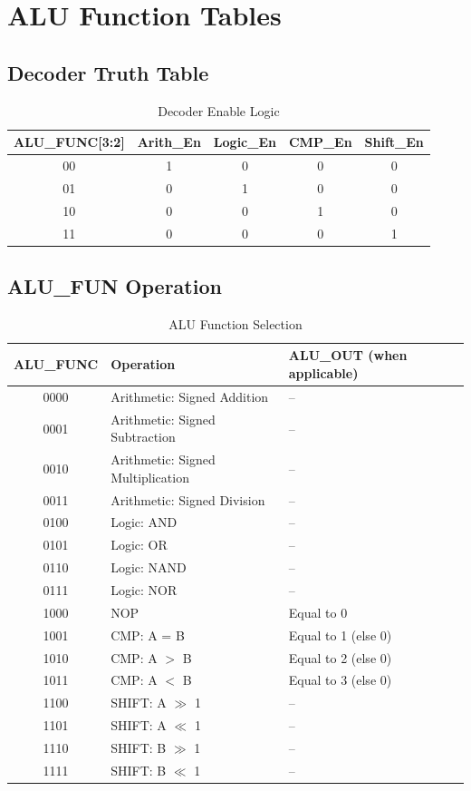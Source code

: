 \documentclass[11pt]{article}
\begin{document}
\section{ALU Function Tables}

\subsection{Decoder Truth Table}
\begin{table}[H]
    \centering
    \begin{tabular}{ccccc}
        \toprule
        \textbf{ALU\_FUNC[3:2]} & \textbf{Arith\_En} & \textbf{Logic\_En} & \textbf{CMP\_En} & \textbf{Shift\_En} \\
        \midrule
        00 & 1 & 0 & 0 & 0 \\
        01 & 0 & 1 & 0 & 0 \\
        10 & 0 & 0 & 1 & 0 \\
        11 & 0 & 0 & 0 & 1 \\
        \bottomrule
    \end{tabular}
    \caption{Decoder Enable Logic}
\end{table}

\subsection{ALU\_FUN Operation}
\begin{table}[H]
    \centering
    \begin{tabular}{cll}
        \toprule
        \textbf{ALU\_FUNC} & \textbf{Operation} & \textbf{ALU\_OUT (when applicable)} \\
        \midrule
        0000 & Arithmetic: Signed Addition & -- \\
        0001 & Arithmetic: Signed Subtraction & -- \\
        0010 & Arithmetic: Signed Multiplication & -- \\
        0011 & Arithmetic: Signed Division & -- \\
        0100 & Logic: AND & -- \\
        0101 & Logic: OR & -- \\
        0110 & Logic: NAND & -- \\
        0111 & Logic: NOR & -- \\
        1000 & NOP & Equal to 0 \\
        1001 & CMP: A = B & Equal to 1 (else 0) \\
        1010 & CMP: A $>$ B & Equal to 2 (else 0) \\
        1011 & CMP: A $<$ B & Equal to 3 (else 0) \\
        1100 & SHIFT: A $\gg$ 1 & -- \\
        1101 & SHIFT: A $\ll$ 1 & -- \\
        1110 & SHIFT: B $\gg$ 1 & -- \\
        1111 & SHIFT: B $\ll$ 1 & -- \\
        \bottomrule
    \end{tabular}
    \caption{ALU Function Selection}
\end{table}
\end{document}
